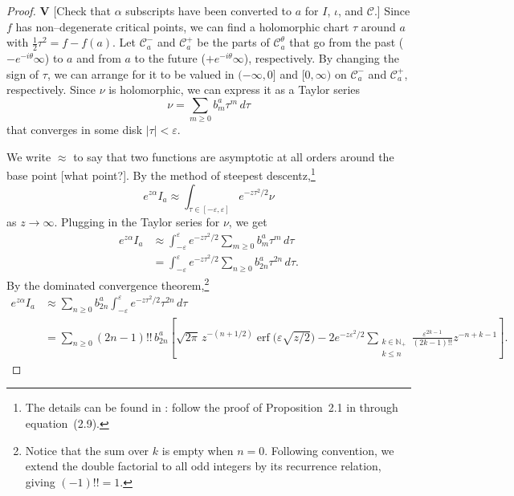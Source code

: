 \documentclass{article}
\theoremstyle{definition}
\theoremstyle{plain}
\newenvironment{todo}{\color{Coral}}{\color{black}}
\begin{document}
\begin{proof}
\begin{todo}\textbf{V} [Check that $\alpha$ subscripts have been converted to $a$ for $I$, $\iota$, and $\mathcal{C}$.]\end{todo} Since $f$ has non--degenerate critical points, we can find a holomorphic chart $\tau$ around $a$ with $\tfrac{1}{2} \tau^2 = f - f(a)$. Let $\mathcal{C}^-_a$ and $\mathcal{C}^+_a$ be the parts of $\mathcal{C}_a^\theta$ that go from the past ($-e^{-i\theta}\infty$) to $a$ and from $a$ to the future ($+e^{-i\theta}\infty$), respectively. By changing the sign of $\tau$, we can arrange for it to be valued in $(-\infty, 0]$ and $[0,\infty)$ on $\mathcal{C}^-_a$ and $\mathcal{C}^+_a$, respectively. Since $\nu$ is holomorphic, we can express it as a Taylor series
\[ \nu = \sum_{m \ge 0} b_m^a \tau^m\,d\tau \]
that converges in some disk $|\tau| < \varepsilon$.

We write $\approx$ to say that two functions are asymptotic at all orders around the base point \begin{todo}[what point?]\end{todo}. By the method of steepest descentz,\footnote{The details can be found in \cite{miller2006applied}: follow the proof of Proposition~2.1 in through equation~(2.9).}
\[ e^{z \alpha} I_a \approx \int_{\tau \in [-\varepsilon, \varepsilon]} e^{-z\tau^2/2} \nu \]
as $z \to \infty$. Plugging in the Taylor series for $\nu$, we get
\begin{align*}
e^{z \alpha} I_a & \approx \int_{-\varepsilon}^\varepsilon e^{-z\tau^2/2} \sum_{m \ge 0} b_m^a \tau^m\,d\tau \\
& = \int_{-\varepsilon}^\varepsilon e^{-z\tau^2/2} \sum_{n \ge 0} b_{2n}^a \tau^{2n}\,d\tau.
\end{align*}
By the dominated convergence theorem,\footnote{Notice that the sum over $k$ is empty when $n = 0$. Following convention, we extend the double factorial to all odd integers by its recurrence relation, giving $(-1)!! = 1$.}
\begin{align*}
e^{z \alpha} I_a & \approx \sum_{n \ge 0} b_{2n}^a \int_{-\varepsilon}^\varepsilon e^{-z\tau^2/2} \tau^{2n}\,d\tau \\
& = \sum_{n \ge 0} (2n-1)!!\,b_{2n}^a \left[ \sqrt{2\pi}\,z^{-(n+1/2)} \operatorname{erf}\big(\varepsilon \sqrt{z/2}\big) - 2e^{-z\varepsilon^2/2} \sum_{\substack{k \in \mathbb{N}_+ \\ k \le n}} \frac{\varepsilon^{2k-1}}{(2k-1)!!} z^{-n+k-1} \right].
\end{align*}


\end{proof}
\end{document}
